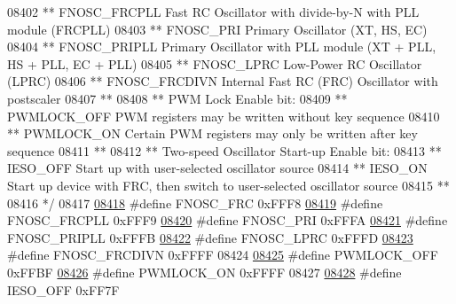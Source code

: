 \begin{DoxyCode}
{{{{08402 \textcolor{comment}{**     FNOSC\_FRCPLL         Fast RC Oscillator with divide-by-N with PLL module (FRCPLL) }
08403 \textcolor{comment}{**     FNOSC\_PRI            Primary Oscillator (XT, HS, EC)}
08404 \textcolor{comment}{**     FNOSC\_PRIPLL         Primary Oscillator with PLL module (XT + PLL, HS + PLL, EC + PLL)}
08405 \textcolor{comment}{**     FNOSC\_LPRC           Low-Power RC Oscillator (LPRC)}
08406 \textcolor{comment}{**     FNOSC\_FRCDIVN        Internal Fast RC (FRC) Oscillator with postscaler}
08407 \textcolor{comment}{**}
08408 \textcolor{comment}{**   PWM Lock Enable bit:}
08409 \textcolor{comment}{**     PWMLOCK\_OFF          PWM registers may be written without key sequence}
08410 \textcolor{comment}{**     PWMLOCK\_ON           Certain PWM registers may only be written after key sequence}
08411 \textcolor{comment}{**}
08412 \textcolor{comment}{**   Two-speed Oscillator Start-up Enable bit:}
08413 \textcolor{comment}{**     IESO\_OFF             Start up with user-selected oscillator source}
08414 \textcolor{comment}{**     IESO\_ON              Start up device with FRC, then switch to user-selected oscillator source}
08415 \textcolor{comment}{**}
08416 \textcolor{comment}{*/}
08417 
\hypertarget{a00009_source_l08418}{}\hyperlink{a00009_ad66b210abf2655398404f42610d89978}{08418} \textcolor{preprocessor}{#define FNOSC\_FRC            0xFFF8}
\hypertarget{a00009_source_l08419}{}\hyperlink{a00009_a07778c58ea92bd8b1a046a569c28d562}{08419} \textcolor{preprocessor}{#define FNOSC\_FRCPLL         0xFFF9}
\hypertarget{a00009_source_l08420}{}\hyperlink{a00009_a652808bfce54b4b230ec7bd0da729138}{08420} \textcolor{preprocessor}{#define FNOSC\_PRI            0xFFFA}
\hypertarget{a00009_source_l08421}{}\hyperlink{a00009_a9cda9f73a5496fc989a07ab24b903fef}{08421} \textcolor{preprocessor}{#define FNOSC\_PRIPLL         0xFFFB}
\hypertarget{a00009_source_l08422}{}\hyperlink{a00009_aa1c3ad35349778b98abf1c92ed17127e}{08422} \textcolor{preprocessor}{#define FNOSC\_LPRC           0xFFFD}
\hypertarget{a00009_source_l08423}{}\hyperlink{a00009_a61bfa791d1c7642fd0eb3fc3feb9a5c9}{08423} \textcolor{preprocessor}{#define FNOSC\_FRCDIVN        0xFFFF}
08424 
\hypertarget{a00009_source_l08425}{}\hyperlink{a00009_ad2e51cc85aacdf0e4121efbc51d2defa}{08425} \textcolor{preprocessor}{#define PWMLOCK\_OFF          0xFFBF}
\hypertarget{a00009_source_l08426}{}\hyperlink{a00009_ab58ddc0b061a884ea5d02e9f59a7d83a}{08426} \textcolor{preprocessor}{#define PWMLOCK\_ON           0xFFFF}
08427 
\hypertarget{a00009_source_l08428}{}\hyperlink{a00009_a75a6ce6820b919d14bff54221200da13}{08428} \textcolor{preprocessor}{#define IESO\_OFF             0xFF7F}
}}}}
\end{DoxyCode}
